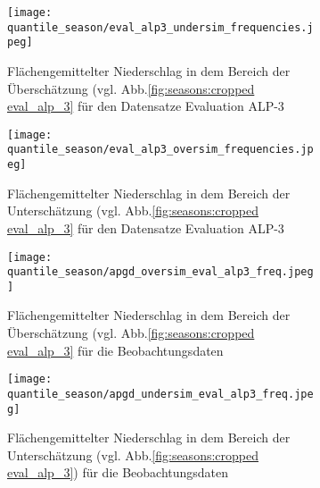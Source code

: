 \begin{figure}[h]
	\begin{subfigure}{0.49\textwidth}
		\texttt{[image: quantile\_season/eval\_alp3\_undersim\_frequencies.jpeg]}
		\caption{Flächengemittelter Niederschlag in dem Bereich der Überschätzung (vgl. Abb.\ref{fig:seasons:cropped eval_alp_3} für den Datensatze Evaluation ALP-3}
		\label{fig:seasons:oversim eval_alp_3}
	\end{subfigure}
	\begin{subfigure}{0.49\textwidth}
		\texttt{[image: quantile\_season/eval\_alp3\_oversim\_frequencies.jpeg]}
		\caption{Flächengemittelter Niederschlag in dem Bereich der Unterschätzung (vgl. Abb.\ref{fig:seasons:cropped eval_alp_3} für den Datensatze Evaluation ALP-3}
		\label{fig:seasons:undersim_eval_alp_3}
	\end{subfigure}
	\caption{}
	\label{fig:seasons:overunder_eval_alp3}
\end{figure}
\begin{figure}[h]
	\begin{subfigure}{0.49\textwidth}
		\texttt{[image: quantile\_season/apgd\_oversim\_eval\_alp3\_freq.jpeg]}
		\caption{Flächengemittelter Niederschlag in dem Bereich der Überschätzung (vgl. Abb.\ref{fig:seasons:cropped eval_alp_3} für die Beobachtungsdaten}
		\label{fig:seasons:oversim eval_alp_3_obs}
	\end{subfigure}
	\begin{subfigure}{0.49\textwidth}
		\texttt{[image: quantile\_season/apgd\_undersim\_eval\_alp3\_freq.jpeg]}
		\caption{Flächengemittelter Niederschlag in dem Bereich der Unterschätzung (vgl. Abb.\ref{fig:seasons:cropped eval_alp_3}) für die Beobachtungsdaten}
		\label{fig:seasons:undersim_eval_alp_3_obs}
	\end{subfigure}
	\caption{}
	\label{fig:seasons:overunder_obs_eval_alp3}
\end{figure}

